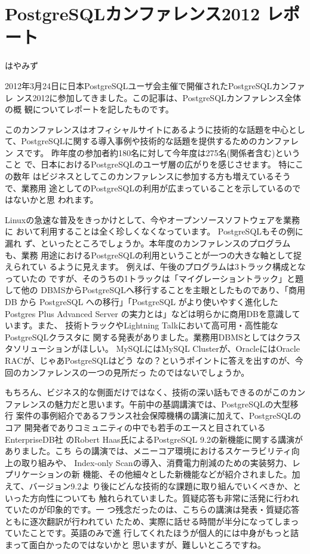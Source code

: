 
\chapter{PostgreSQLカンファレンス2012 レポート}

\begin{flushright}
 {\headfont はやみず}
\end{flushright}

2012年3月24日に日本PostgreSQLユーザ会主催で開催されたPostgreSQLカンファレ
ンス2012に参加してきました。この記事は、PostgreSQLカンファレンス全体の概
観についてレポートを記したものです。

このカンファレンスはオフィシャルサイトにあるように技術的な話題を中心とし
て、PostgreSQLに関する導入事例や技術的な話題を提供するためのカンファレン
スです。 昨年度の参加者約180名に対して今年度は275名(関係者含む)ということ
で、日本におけるPostgreSQLのユーザ層の広がりを感じさせます。 特にこの数年
はビジネスとしてこのカンファレンスに参加する方も増えているそうで、業務用
途としてのPostgreSQLの利用が広まっていることを示しているのではないかと思
われます。

Linuxの急速な普及をきっかけとして、今やオープンソースソフトウェアを業務に
おいて利用することは全く珍しくなくなっています。 PostgreSQLもその例に漏れ
ず、といったところでしょうか。本年度のカンファレンスのプログラムも、業務
用途におけるPostgreSQLの利用ということが一つの大きな軸として捉えられてい
るように見えます。 例えば、午後のプログラムは3トラック構成となっていたの
ですが、そのうちの1トラックは「マイグレーショントラック」と題して他の
DBMSからPostgreSQLへ移行することを主眼としたものであり、「商用 DB から
PostgreSQL への移行」「PostgreSQL がより使いやすく進化した Postgres Plus
Advanced Server の実力とは」などは明らかに商用DBを意識しています。また、
技術トラックやLightning Talkにおいて高可用・高性能なPostgreSQLクラスタに
関する発表がありました。業務用DBMSとしてはクラスタソリューションがほしい。
MySQLにはMySQL Clusterが、OracleにはOracle RACが、じゃあPostgreSQLはどう
なの？というポイントに答えを出すのが、今回のカンファレンスの一つの見所だっ
たのではないでしょうか。

もちろん、ビジネス的な側面だけではなく、技術の深い話もできるのがこのカン
ファレンスの魅力だと思います。午前中の基調講演では、PostgreSQLの大型移行
案件の事例紹介であるフランス社会保障機構の講演に加えて、PostgreSQLのコア
開発者でありコミュニティの中でも若手のエースと目されているEnterpriseDB社
のRobert Haas氏によるPostgreSQL 9.2の新機能に関する講演がありました。こち
らの講演では、メニーコア環境におけるスケーラビリティ向上の取り組みや、
Index-only Scanの導入、消費電力削減のための実装努力、レプリケーションの新
機能、その他細々とした新機能などが紹介されました。加えて、バージョン9.2よ
り後にどんな技術的な課題に取り組んでいくべきか、といった方向性についても
触れられていました。質疑応答も非常に活発に行われていたのが印象的です。一
つ残念だったのは、こちらの講演は発表・質疑応答ともに逐次翻訳が行われてい
たため、実際に話せる時間が半分になってしまっていたことです。英語のみで進
行してくれたほうが個人的には中身がもっと詰まって面白かったのではないかと
思いますが、難しいところですね。

